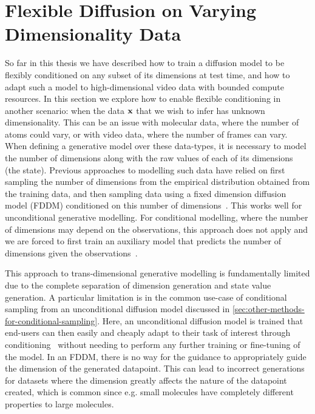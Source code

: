 \newtheorem{proposition}{Proposition}
\newtheorem{lemma}{Lemma}
\newtheorem{assumption}{Assumption}

\chapter{Flexible Diffusion on Varying Dimensionality Data}
\label{ch:tddm}

So far in this thesis we have described how to train a diffusion model to be flexibly conditioned on any subset of its dimensions at test time, and how to adapt such a model to high-dimensional video data with bounded compute resources. In this section we explore how to enable flexible conditioning in another scenario: when the data ${\mathbf{x}}$ that we wish to infer has unknown dimensionality. This can be an issue with molecular data, where the number of atoms could vary, or with video data, where the number of frames can vary. When defining a generative model over these data-types, it is necessary to model the number of dimensions along with the raw values of each of its dimensions (the state). Previous approaches to modelling such data have relied on first sampling the number of dimensions from the empirical distribution obtained from the training data, and then sampling data using a fixed dimension diffusion model (FDDM) conditioned on this number of dimensions~\cite{hoogeboom2022equivariant}. This works well for unconditional generative modelling. For conditional modelling, where the number of dimensions may depend on the observations, this approach does not apply and we are forced to first train an auxiliary model that predicts the number of dimensions given the observations~\cite{igashov2022equivariant}.

This approach to trans-dimensional generative modelling is fundamentally limited due to the complete separation of dimension generation and state value generation. A particular limitation is in the common use-case of conditional sampling from an unconditional diffusion model discussed in \cref{sec:other-methods-for-conditional-sampling}. Here, an unconditional diffusion model is trained that end-users can then easily and cheaply adapt to their task of interest through conditioning~\cite{song2020score, dhariwal2021diffusion, clip_guided_diffusion, zhang2023towards} without needing to perform any further training or fine-tuning of the model. In an FDDM, there is no way for the guidance to appropriately guide the dimension of the generated datapoint. This can lead to incorrect generations for datasets where the dimension greatly affects the nature of the datapoint created, which is common since e.g. small molecules have completely different properties to large molecules.

